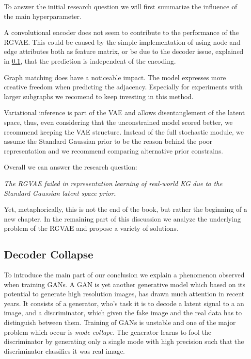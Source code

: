To answer the initial research question we will first summarize the influence of the main hyperparameter.

A convolutional encoder does not seem to contribute to the performance of the RGVAE. This could be caused by the simple implementation of using node and edge attributes both as feature matrix, or be due to the decoder issue, explained in \ref{ssec7:collapse}, that the prediction is independent of the encoding. 

Graph matching does have a noticeable impact. The model expresses more creative freedom when predicting the adjacency. Especially for experiments with larger subgraphs we recomend to keep investing in this method.

Variational inference is part of the VAE and allows disentanglement of the latent space, thus, even considering that the unconstrained model scored better, we recommend keeping the VAE structure. Instead of the full stochastic module, we assume the Standard Gaussian prior to be the reason behind the poor representation and we recommend comparing alternative prior constrains.

Overall we can answer the research question:

\begin{center}
    \textit{The RGVAE failed in representation learning of real-world KG due to the Standard Gaussian latent space prior.}
\end{center}

Yet, metaphorically, this is not the end of the book, but rather the beginning of a new chapter. In the remaining part of this discussion we analyze the underlying problem of the RGVAE and propose a variety of solutions.


\subsection{Decoder Collapse}
\label{ssec7:collapse}

To introduce the main part of our conclusion we explain a phenomenon observed when training GANs. A GAN is yet another generative model which based on its potential to generate high resolution images, has drawn much attention in recent years. It consists of a generator, who's task it is to decode a latent signal to a an image, and a discriminator, which given the fake image and the real data has to distinguish between them. Training of GANs is unstable and one of the major problem which occur is \textit{mode collape}. The generator learns to fool the discriminator by generating only a single mode with high precision such that the discriminator classifies it was real image.


